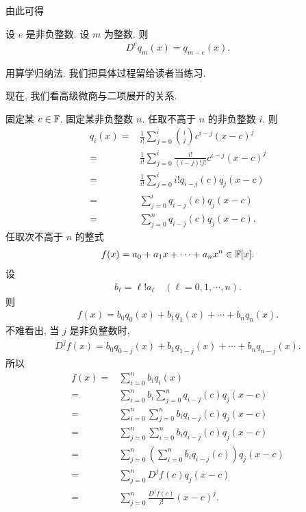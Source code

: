 由此可得

\begin{proposition}
    设 $e$ 是非负整数. 设 $m$ 为整数. 则
    \begin{align*}
        D^e q_m (x) = q_{m-e} (x).
    \end{align*}
\end{proposition}

\begin{pf}
    用算学归纳法. 我们把具体过程留给读者当练习.
\end{pf}

现在, 我们看高级微商与二项展开的关系.

固定某 $c \in \mathbb{F}$. 固定某非负整数 $n$. 任取不高于 $n$ 的非负整数 $i$. 则
\begin{align*}
    q_{i} (x)
    = {} & \frac{1}{i!} \sum_{j = 0}^{i} \binom{i}{j} c^{i - j} (x-c)^{j}           \\
    = {} & \frac{1}{i!} \sum_{j = 0}^{i} \frac{i!}{(i - j)! j!} c^{i - j} (x-c)^{j} \\
    = {} & \frac{1}{i!} \sum_{j = 0}^{i} i! q_{i-j} (c) q_{j} (x-c)                 \\
    = {} & \sum_{j = 0}^{i} q_{i-j} (c) q_{j} (x-c)                                 \\
    = {} & \sum_{j = 0}^{n} q_{i-j} (c) q_{j} (x-c).
\end{align*}
任取次不高于 $n$ 的整式
\begin{align*}
    f(x) = a_0 + a_1 x + \cdots + a_n x^n \in \mathbb{F}[x].
\end{align*}
设
\begin{align*}
    b_\ell = \ell! a_\ell \quad (\ell = 0,1,\cdots,n).
\end{align*}
则
\begin{align*}
    f(x) = b_0 q_0 (x) + b_1 q_1 (x) + \cdots + b_n q_n (x).
\end{align*}
不难看出, 当 $j$ 是非负整数时,
\begin{align*}
    D^j f(x) = b_0 q_{0-j} (x) + b_1 q_{1-j} (x) + \cdots + b_n q_{n-j} (x).
\end{align*}
所以
\begin{align*}
    f(x)
    = {} & \sum_{i = 0}^{n} b_i q_i (x)                                     \\
    = {} & \sum_{i = 0}^{n} b_i \sum_{j = 0}^{n} q_{i-j} (c) q_{j} (x-c)    \\
    = {} & \sum_{i = 0}^{n} \sum_{j = 0}^{n} b_i q_{i-j} (c) q_{j} (x-c)    \\
    = {} & \sum_{j = 0}^{n} \sum_{i = 0}^{n} b_i q_{i-j} (c) q_{j} (x-c)    \\
    = {} & \sum_{j = 0}^{n} \left( \sum_{i = 0}^{n} b_i q_{i-j} (c) \right)
    q_{j} (x-c)                                                             \\
    = {} & \sum_{j = 0}^{n} D^j f(c) q_{j} (x-c)                            \\
    = {} & \sum_{j = 0}^{n} \frac{D^j f(c)}{j!} (x-c)^j.
\end{align*}

